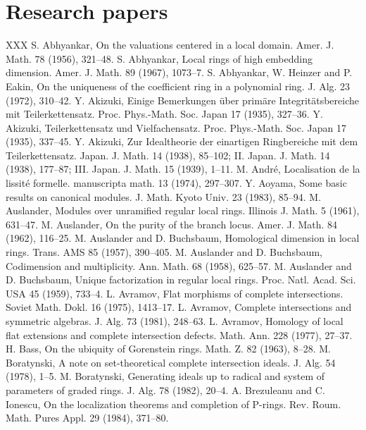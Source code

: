 \section*{Research papers}
\begin{thebibliography}{XXX}
 S. Abhyankar, On the valuations centered in a local domain. Amer. J. Math. 78 (1956), 321--48.
 S. Abhyankar, Local rings of high embedding dimension. Amer. J. Math. 89 (1967), 1073--7.
 S. Abhyankar, W. Heinzer and P. Eakin, On the uniqueness of the coefficient ring in a polynomial ring. J. Alg. 23 (1972), 310--42.
 Y. Akizuki, Einige Bemerkungen \"uber prim\"are Integrit\"atsbereiche mit Teilerkettensatz. Proc. Phys.-Math. Soc. Japan 17 (1935), 327--36.
 Y. Akizuki, Teilerkettensatz und Vielfachensatz. Proc. Phys.-Math. Soc. Japan 17 (1935), 337--45.
 Y. Akizuki, Zur Idealtheorie der einartigen Ringbereiche mit dem Teilerkettensatz. Japan. J. Math. 14 (1938), 85--102; II. Japan. J. Math. 14 (1938), 177--87; III. Japan. J. Math. 15 (1939), 1--11.
 M. Andr\'e, Localisation de la lissit\'e formelle. manuscripta math. 13 (1974), 297--307.
 Y. Aoyama, Some basic results on canonical modules. J. Math. Kyoto Univ. 23 (1983), 85--94.
 M. Auslander, Modules over unramified regular local rings. Illinois J. Math. 5 (1961), 631--47.
 M. Auslander, On the purity of the branch locus. Amer. J. Math. 84 (1962), 116--25.
 M. Auslander and D. Buchsbaum, Homological dimension in local rings. Trans. AMS 85 (1957), 390--405.
 M. Auslander and D. Buchsbaum, Codimension and multiplicity. Ann. Math. 68 (1958), 625--57.
 M. Auslander and D. Buchsbaum, Unique factorization in regular local rings. Proc. Natl. Acad. Sci. USA 45 (1959), 733--4.
 L. Avramov, Flat morphisms of complete intersections. Soviet Math. Dokl. 16 (1975), 1413--17.
 L. Avramov, Complete intersections and symmetric algebras. J. Alg. 73 (1981), 248--63.
 L. Avramov, Homology of local flat extensions and complete intersection defects. Math. Ann. 228 (1977), 27--37.
 H. Bass, On the ubiquity of Gorenstein rings. Math. Z. 82 (1963), 8--28.
 M. Boratynski, A note on set-theoretical complete intersection ideals. J. Alg. 54 (1978), 1--5.
 M. Boratynski, Generating ideals up to radical and system of parameters of graded rings. J. Alg. 78 (1982), 20--4.
 A. Brezuleanu and C. Ionescu, On the localization theorems and completion of P-rings. Rev. Roum. Math. Pures Appl. 29 (1984), 371--80.

\end{thebibliography}
